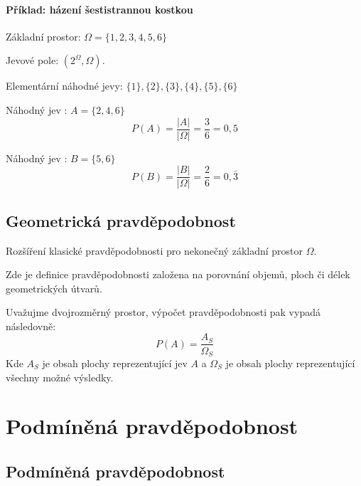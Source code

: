 \paragraph*{Příklad: házení šestistrannou kostkou}

\begin{compactitem}
    \item Základní prostor: $\Omega = \{ 1, 2, 3, 4, 5, 6 \}$
    \item Jevové pole: $(2^{\Omega}, \Omega)$.
    \item Elementární náhodné jevy: $ \{1\}, \{2\}, \{3\}, \{4\}, \{5\}, \{6\} $
    \item Náhodný jev : $A = \{ 2, 4, 6 \}$
    $$ P(A) = \frac{|A|}{|\Omega|} = \frac{3}{6} = 0,5 $$
    \item Náhodný jev : $B = \{ 5, 6 \}$
    $$ P(B) = \frac{|B|}{|\Omega|} = \frac{2}{6} = 0,\bar{3} $$
\end{compactitem}

\subsection{Geometrická pravděpodobnost}

\begin{compactitem}
    \item Rozšíření klasické pravděpodobnosti pro nekonečný základní prostor $\Omega$.

    \item Zde je definice pravděpodobnosti založena na porovnání objemů, ploch či délek geometrických útvarů.

    \item Uvažujme dvojrozměrný prostor, výpočet pravděpodobnosti pak vypadá následovně:
    $$ P(A) = \frac{A_S}{\Omega_S}$$
    Kde $A_S$ je obsah plochy reprezentující jev $A$ a $\Omega_S$ je obsah plochy reprezentující všechny možné výsledky.
\end{compactitem}


\section{Podmíněná pravděpodobnost}

\subsection{Podmíněná pravděpodobnost}

